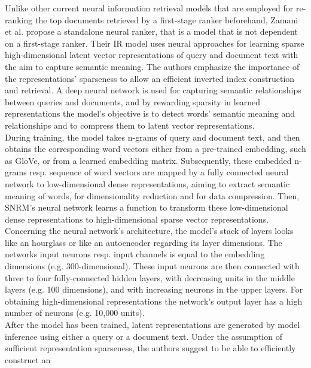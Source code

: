 Unlike other current neural information retrieval models that 
    are employed for re-ranking the top documents retrieved by 
    a first-stage ranker beforehand,
    Zamani et al. \cite{zamani:2018:from-neural-reranking-to-neural-ranking} 
    propose a standalone neural ranker, that is
    a model that is not dependent on a first-stage ranker.
Their IR model uses neural approaches for learning sparse high-dimensional
    latent vector representations of query and document text 
    with the aim to capture semantic meaning.
The authors emphasize the importance of the representations' sparseness
    to allow an efficient inverted index construction and retrieval.
A deep neural network is used for capturing semantic relationships between
    queries and documents, and by rewarding sparsity in learned representations
    the model's objective is to detect words' semantic meaning and 
    relationships and to compress them to latent vector representations.\\
During training, the model takes n-grams of query and document text,
    and then obtains the corresponding word vectors 
    either from a pre-trained embedding, such as GloVe, or 
    from a learned embedding matrix. 
Subsequently, these embedded n-grams resp. sequence of word vectors 
    are mapped by a fully connected neural network 
    to low-dimensional dense representations,
    aiming to extract semantic meaning of words, 
    for dimensionality reduction and for data compression.
Then, SNRM's neural network learns a function to transform 
    these low-dimensional dense representations to 
    high-dimensional sparse vector representations.\\
Concerning the neural network's architecture, the model's 
    stack of layers looks like an hourglass or like an autoencoder
    regarding its layer dimensions.
The networks input neurons resp. input channels is equal to the
    embedding dimensions (e.g. 300-dimensional).
These input neurons are then connected with three to four 
    fully-connected hidden layers, with decreasing units in the middle 
    layers (e.g. 100 dimensions), and with increasing neurons in 
    the upper layers.
For obtaining high-dimensional representations the network's output 
    layer has a high number of neurons (e.g. 10,000 units).\\
After the model has been trained, latent representations are generated
    by model inference using either a query or a document text.
Under the assumption of sufficient representation sparseness, 
    the authors suggest to be able to efficiently construct an 
